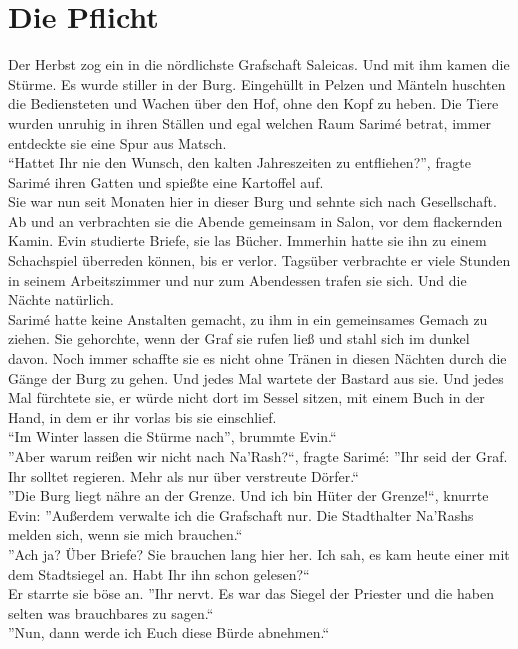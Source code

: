 
\chapter{Die Pflicht}

Der Herbst zog ein in die nördlichste Grafschaft Saleicas. Und mit ihm kamen die Stürme. Es wurde 
stiller in der Burg. Eingehüllt in Pelzen und Mänteln huschten die Bediensteten und Wachen über den 
Hof, ohne den Kopf zu heben. Die Tiere wurden unruhig in ihren Ställen und egal welchen Raum Sarimé 
betrat, immer entdeckte sie eine Spur aus Matsch.\\
``Hattet Ihr nie den Wunsch, den kalten Jahreszeiten zu entfliehen?'', fragte Sarimé ihren Gatten 
und spießte eine Kartoffel auf.\\
Sie war nun seit Monaten hier in dieser Burg und sehnte sich nach Gesellschaft. Ab und an 
verbrachten sie die Abende gemeinsam in Salon, vor dem flackernden Kamin. Evin studierte Briefe, sie 
las Bücher. Immerhin hatte sie ihn zu einem Schachspiel überreden können, bis er verlor. Tagsüber 
verbrachte er viele Stunden in seinem Arbeitszimmer und nur zum Abendessen trafen sie sich. Und die 
Nächte natürlich.\\
Sarimé hatte keine Anstalten gemacht, zu ihm in ein gemeinsames Gemach zu ziehen. Sie gehorchte, 
wenn der Graf sie rufen ließ und stahl sich im dunkel davon. Noch immer schaffte sie es nicht ohne 
Tränen in diesen Nächten durch die Gänge der Burg zu gehen. Und jedes Mal wartete der Bastard aus 
sie. Und jedes Mal fürchtete sie, er würde nicht dort im Sessel sitzen, mit einem Buch in der Hand, 
in dem er ihr vorlas bis sie einschlief.\\
``Im Winter lassen die Stürme nach'', brummte Evin.``\\
''Aber warum reißen wir nicht nach Na'Rash?``, fragte Sarimé: ''Ihr seid der Graf. Ihr solltet 
regieren. Mehr als nur über verstreute Dörfer.``\\
''Die Burg liegt nähre an der Grenze. Und ich bin Hüter der Grenze!``, knurrte Evin: ''Außerdem 
verwalte ich die Grafschaft nur. Die Stadthalter Na'Rashs melden sich, wenn sie mich brauchen.``\\
''Ach ja? Über Briefe? Sie brauchen lang hier her. Ich sah, es kam heute einer mit dem Stadtsiegel 
an. Habt Ihr ihn schon gelesen?``\\
Er starrte sie böse an. ''Ihr nervt. Es war das Siegel der Priester und die haben selten was 
brauchbares zu sagen.``\\
''Nun, dann werde ich Euch diese Bürde abnehmen.``\\
